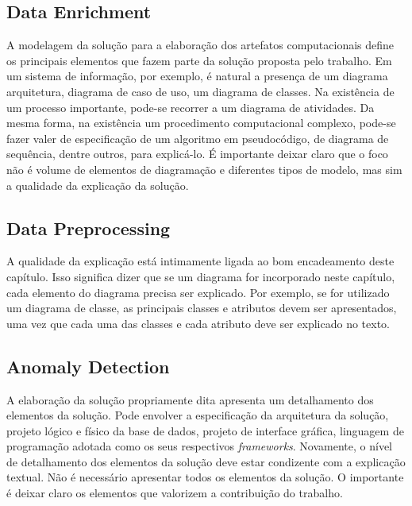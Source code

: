 \documentclass[12pt]{article}
\begin{document}
    \subsection{Data Enrichment}
	\label{subsec_met_enrichment}
	
	A modelagem da solução para a elaboração dos artefatos computacionais define os principais elementos que fazem parte da solução proposta pelo trabalho. Em um sistema de informação, por exemplo, é natural a presença de um diagrama arquitetura, diagrama de caso de uso, um diagrama de classes. Na existência de um processo importante, pode-se recorrer a um diagrama de atividades. Da mesma forma, na existência um procedimento computacional complexo, pode-se fazer valer de especificação de um algoritmo em pseudocódigo, de diagrama de sequência, dentre outros, para explicá-lo. É importante deixar claro que o foco não é volume de elementos de diagramação e diferentes tipos de modelo, mas sim a qualidade da explicação da solução.

    \subsection{Data Preprocessing}
	\label{subsec_met_preprocessing}
	
	A qualidade da explicação está intimamente ligada ao bom encadeamento deste capítulo. Isso significa dizer que se um diagrama for incorporado neste capítulo, cada elemento do diagrama precisa ser explicado. Por exemplo, se for utilizado um diagrama de classe, as principais classes e atributos devem ser apresentados, uma vez que cada uma das classes e cada atributo deve ser explicado no texto.

    \subsection{Anomaly Detection}
	\label{subsec_met_anomaly_detection}
	
	A elaboração da solução propriamente dita apresenta um detalhamento dos elementos da solução. Pode envolver a especificação da arquitetura da solução, projeto lógico e físico da base de dados, projeto de interface gráfica, linguagem de programação adotada como os seus respectivos \emph{frameworks}. Novamente, o nível de detalhamento dos elementos da solução deve estar condizente com a explicação textual. Não é necessário apresentar todos os elementos da solução. O importante é deixar claro os elementos que valorizem a contribuição do trabalho.
	
\end{document}
